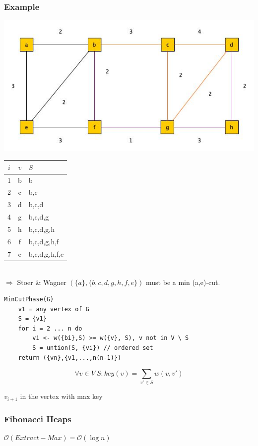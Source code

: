 \subsubsection{Example}
\begin{center}
	\includegraphics[scale=0.75]{img/graph9}
\end{center}
\begin{tabular}{|c|c|l|}\hline 
	$i$ & $v$ & $S$ \\ \hline 
	1 & b & b \\
	2 & c & b,c \\
	3 & d & b,c,d \\
	4 & g & b,c,d,g \\
	5 & h & b,c,d,g,h \\
	6 & f & b,c,d,g,h,f \\
	7 & e & b,c,d,g,h,f,e \\ \hline 
\end{tabular} \\
$\Rightarrow$ Stoer \& Wagner $(\{a\}, \{b,c,d,g,h,f,e\})$ must be a min (a,e)-cut.

\begin{verbatim}
MinCutPhase(G)
    v1 = any vertex of G
    S = {v1}
    for i = 2 ... n do
        vi <- w({bi},S) >= w({v}, S), v not in V \ S
        S = untion(S, {vi}) // ordered set
    return ({vn},{v1,...,n(n-1)})
\end{verbatim} 
$$\forall v \in V \ S: key(v) = \sum_{v'\in S}w(v,v')$$

$v_{i+1}$ in the vertex with max key

\subsubsection{Fibonacci Heaps}

$\mathcal{O}(Extract-Max) = \mathcal{O}(\log n)$ \\

